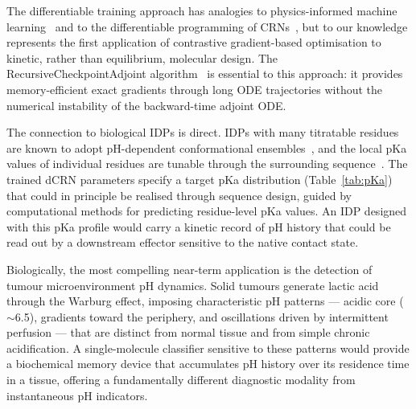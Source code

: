 \documentclass[10pt,twocolumn]{article}
\begin{document}
The differentiable training approach has analogies to physics-informed machine learning~\cite{goodrich2021} and to the differentiable programming of CRNs~\cite{buisman2023}, but to our knowledge represents the first application of contrastive gradient-based optimisation to kinetic, rather than equilibrium, molecular design.
The RecursiveCheckpointAdjoint algorithm~\cite{kidger2022} is essential to this approach: it provides memory-efficient exact gradients through long ODE trajectories without the numerical instability of the backward-time adjoint ODE.

The connection to biological IDPs is direct.
IDPs with many titratable residues are known to adopt pH-dependent conformational ensembles~\cite{moses2020,moses2023,ruff2025,moritsugu2012}, and the local pKa values of individual residues are tunable through the surrounding sequence~\cite{losdorfer2017}.
The trained dCRN parameters specify a target pKa distribution (Table~\ref{tab:pKa}) that could in principle be realised through sequence design, guided by computational methods for predicting residue-level pKa values.
An IDP designed with this pKa profile would carry a kinetic record of pH history that could be read out by a downstream effector sensitive to the native contact state.

Biologically, the most compelling near-term application is the detection of tumour microenvironment pH dynamics.
Solid tumours generate lactic acid through the Warburg effect, imposing characteristic pH patterns — acidic core ($\sim$6.5), gradients toward the periphery, and oscillations driven by intermittent perfusion — that are distinct from normal tissue and from simple chronic acidification.
A single-molecule classifier sensitive to these patterns would provide a biochemical memory device that accumulates pH history over its residence time in a tissue, offering a fundamentally different diagnostic modality from instantaneous pH indicators.
\end{document}
